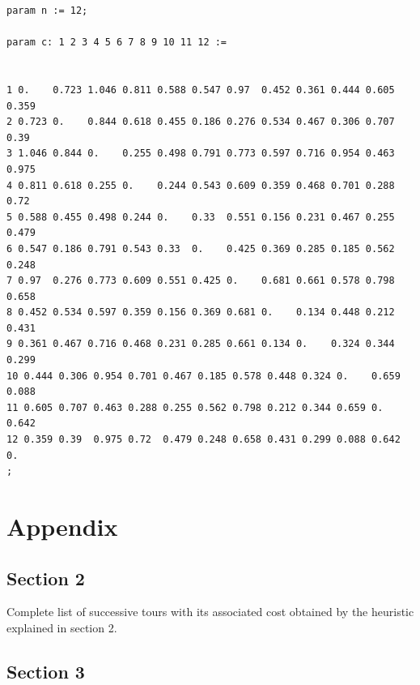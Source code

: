 \documentclass[12pt]{article}
\newenvironment{code}{\captionsetup{type=listing}}{}
\begin{document}
\begin{code}
\label{l1}
\begin{lstlisting}[basicstyle=\small]
param n := 12;

param c: 1 2 3 4 5 6 7 8 9 10 11 12 :=


1 0.    0.723 1.046 0.811 0.588 0.547 0.97  0.452 0.361 0.444 0.605 0.359
2 0.723 0.    0.844 0.618 0.455 0.186 0.276 0.534 0.467 0.306 0.707 0.39 
3 1.046 0.844 0.    0.255 0.498 0.791 0.773 0.597 0.716 0.954 0.463 0.975
4 0.811 0.618 0.255 0.    0.244 0.543 0.609 0.359 0.468 0.701 0.288 0.72 
5 0.588 0.455 0.498 0.244 0.    0.33  0.551 0.156 0.231 0.467 0.255 0.479
6 0.547 0.186 0.791 0.543 0.33  0.    0.425 0.369 0.285 0.185 0.562 0.248
7 0.97  0.276 0.773 0.609 0.551 0.425 0.    0.681 0.661 0.578 0.798 0.658
8 0.452 0.534 0.597 0.359 0.156 0.369 0.681 0.    0.134 0.448 0.212 0.431
9 0.361 0.467 0.716 0.468 0.231 0.285 0.661 0.134 0.    0.324 0.344 0.299
10 0.444 0.306 0.954 0.701 0.467 0.185 0.578 0.448 0.324 0.    0.659 0.088
11 0.605 0.707 0.463 0.288 0.255 0.562 0.798 0.212 0.344 0.659 0.    0.642
12 0.359 0.39  0.975 0.72  0.479 0.248 0.658 0.431 0.299 0.088 0.642 0.
;
\end{lstlisting}
\end{code}

\section{Appendix}
\subsection{Section 2}
Complete list of successive tours with its associated cost obtained by the heuristic explained in section 2.
\begin{code}
\small
{}

\end{code}

\subsection{Section 3}
\begin{code}
\small
{}

\end{code}

\begin{code}
\small
{}

\end{code}
\end{document}
